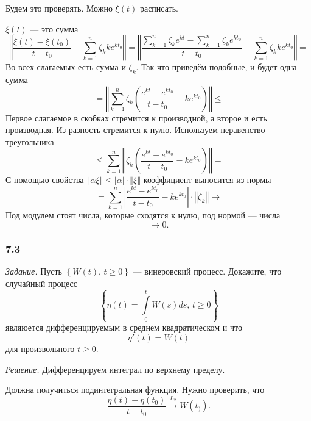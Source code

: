 Будем это проверять.
Можно $ \xi \left( t \right) $ расписать.

$ \xi \left( t \right) $ --- это сумма
$$ \left \Vert
    \frac{ \xi \left( t \right) - \xi \left( t_0 \right) }{t - t_0} -
    \sum \limits_{k = 1}^n \zeta_k k e^{kt_0} \right \Vert =
  \left \Vert
    \frac{ \sum \limits_{k = 1}^n \zeta_k e^{kt} - \sum \limits_{k = 1}^n \zeta_k e^{kt_0}}{t - t_0} -
    \sum \limits_{k = 1}^n \zeta_k ke^{kt_0} \right \Vert =$$
Во всех слагаемых есть сумма и $ \zeta_k$.
Так что приведём подобные, и будет одна сумма
$$= \left \Vert
    \sum \limits_{k = 1}^n \zeta_k \left( \frac{e^{kt} - e^{kt_0}}{t - t_0} - ke^{kt_0} \right)
  \right \Vert \leq$$
Первое слагаемое в скобках стремится к производной, а второе и есть производная.
Из разность стремится к нулю.
Используем неравенство треугольника
$$ \leq \sum \limits_{k = 1}^n
  \left \Vert \zeta_k \left( \frac{e^{kt} - e^{kt_0}}{t - t_0} - ke^{kt_0} \right) \right \Vert =$$
С помощью свойства
$ \left \Vert \alpha \xi \right \Vert \leq
  \left| \alpha \right| \cdot \left \Vert \xi \right \Vert $
коэффициент выносится из нормы
$$= \sum \limits_{k = 1}^n
    \left| \frac{e^{kt} - e^{kt_0}}{t - t_0} - ke^{kt_0} \right| \cdot
    \left \Vert \zeta_k \right \Vert \to$$
Под модулем стоят числа, которые сходятся к нулю, под нормой --- числа
$$ \to 0.$$

\subsubsection*{7.3}

\textit{Задание.}
Пусть $ \left\{ W \left( t \right), \, t \geq 0 \right\} $ --- винеровский процесс.
Докажите, что случайный процесс
$$ \left\{ \eta \left( t \right) = \int \limits_0^t W \left( s \right) ds, \, t \geq 0 \right\} $$
являюется дифференцируемым в среднем квадратическом и что
$$ \eta' \left( t \right) =
  W \left( t \right) $$
для произвольного $t \geq 0$.

\textit{Решение.}
Дифференцируем интеграл по верхнему пределу.

Должна получиться подинтегральная функция.
Нужно проверить, что
$$ \frac{ \eta \left( t \right) - \eta \left( t_0 \right) }{t - t_0} \overset{L_2}{ \to }
  W \left( t_) \right).$$

